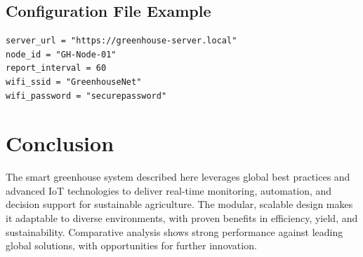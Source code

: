 \documentclass[12pt,a4paper]{article}
\begin{document}
\subsection{Configuration File Example}
\begin{verbatim}
server_url = "https://greenhouse-server.local"
node_id = "GH-Node-01"
report_interval = 60
wifi_ssid = "GreenhouseNet"
wifi_password = "securepassword"
\end{verbatim}

\section{Conclusion}
The smart greenhouse system described here leverages global best practices and advanced IoT technologies to deliver real-time monitoring, automation, and decision support for sustainable agriculture. The modular, scalable design makes it adaptable to diverse environments, with proven benefits in efficiency, yield, and sustainability. Comparative analysis shows strong performance against leading global solutions, with opportunities for further innovation.

\newpage
\end{document}
